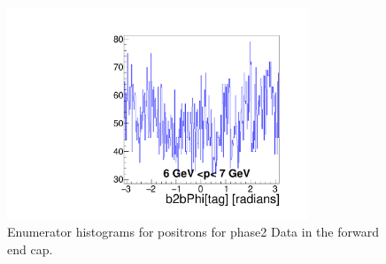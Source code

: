 \documentclass[a4paper,11pt,twosided,final,german,openbib,pdftex,listof=totoc,bibliography=totoc]{scrbook}
\begin{document}
\begin{appendix}
\begin{figure}[!htbp]
	\centering
	\includegraphics[width=9cm]{Plots/master/xPMPhiepFCE_Data}
	\caption[Momentum $\phi$ Positron Forward End Cap Enumerator Histogram Phase2 Data]{Enumerator histograms for positrons for phase2 Data in the forward end cap.}
	\label{plt:PMPhiepFCE_Data}
\end{figure}


\end{appendix}
\end{document}
